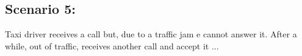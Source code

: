 \subsection{Scenario 5:}

Taxi driver receives a call but, due to a traffic jam e cannot answer it.
After a while, out of traffic, receives another call and accept it
...


